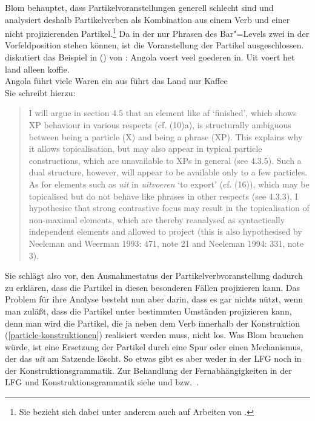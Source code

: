 Blom behauptet, dass Partikelvoranstellungen generell schlecht sind und analysiert
deshalb Partikelverben als Kombination aus einem Verb und einer nicht projizierenden Partikel.\footnote{
 Sie bezieht sich dabei unter anderem auch auf Arbeiten von \citet{Toivonen2002a}.%
}
Da in der \xbart nur Phrasen des Bar"=Levels zwei in der Vorfeldposition stehen können,
ist die Voranstellung der Partikel ausgeschlossen. \citet[]{Blom2005a} diskutiert 
das Beispiel in () von \citet[]{Hoeksema91a}:
\ea
\gll Angola voert veel goederen in. Uit voert het land alleen koffie.\\
     Angola führt viele Waren ein   aus führt das Land nur Kaffee\\
\z
Sie schreibt hierzu:
\begin{quote}
       I will argue in section 4.5 that an element like af `finished', which shows XP
behaviour in various respects (cf. (10)a), is structurally ambiguous between being a
particle (X) and being a phrase (XP). This explains why it allows topicalisation, but
may also appear in typical particle constructions, which are unavailable to XPs in
general (see 4.3.5). Such a dual structure, however, will appear to be available only
to a few particles. As for elements such as \emph{uit} in \emph{uitvoeren} `to export' (cf. (16)),
which may be topicalised but do not behave like phrases in other respects (see
4.3.3), I hypothesise that strong contrastive focus may result in the topicalisation of
non-maximal elements, which are thereby reanalysed as syntactically independent
elements and allowed to project (this is also hypothesised by Neeleman and
Weerman 1993: 471, note 21 and Neeleman 1994: 331, note 3).
\end{quote}
Sie schlägt also vor, den Ausnahmestatus der Partikelverbvoranstellung dadurch zu erklären,
dass die Partikel in diesen besonderen Fällen projizieren kann. Das Problem für ihre
Analyse besteht nun aber darin, dass es gar nichts nützt, wenn man zuläßt, dass die Partikel
unter bestimmten Umständen projizieren kann, denn man wird die Partikel, die ja neben dem
Verb innerhalb der Konstruktion (\ref{particle-konstruktionen}) realisiert werden muss, nicht los.
\z
Was Blom brauchen würde, ist eine Ersetzung der Partikel durch eine Spur oder einen
Mechanismus, der das \emph{uit} am Satzende löscht. So etwas gibt es aber weder in der LFG 
noch in der Konstruktionsgrammatik. Zur Behandlung
der Fernabhängigkeiten in der LFG und Konstruktionsgrammatik siehe  und  bzw.\
.

